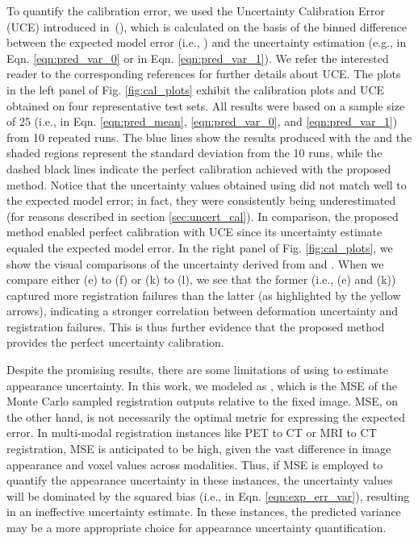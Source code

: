 \documentclass[times,twocolumn,final]{elsarticle}
\begin{document}
To quantify the calibration error, we used the Uncertainty Calibration Error (UCE) introduced in~(\cite{pmlr-v121-laves20a}), which is calculated on the basis of the binned difference between the expected model error (i.e., ) and the uncertainty estimation (e.g.,  in Eqn. \ref{eqn:pred_var_0} or  in Eqn. \ref{eqn:pred_var_1}). We refer the interested reader to the corresponding references for further details about UCE. The plots in the left panel of Fig. \ref{fig:cal_plots} exhibit the calibration plots and UCE obtained on four representative test sets. All results were based on a sample size of 25 (i.e.,  in Eqn. \ref{eqn:pred_mean}, \ref{eqn:pred_var_0}, and \ref{eqn:pred_var_1}) from 10 repeated runs. The blue lines show the results produced with the  and the shaded regions represent the standard deviation from the 10 runs, while the dashed black lines indicate the perfect calibration achieved with the proposed method. Notice that the uncertainty values obtained using  did not match well to the expected model error; in fact, they were consistently being underestimated (for reasons described in section \ref{sec:uncert_cal}). In comparison, the proposed method enabled perfect calibration with UCE  since its uncertainty estimate equaled the expected model error. In the right panel of Fig. \ref{fig:cal_plots}, we show the visual comparisons of the uncertainty derived from  and . When we compare either (e) to (f) or (k) to (l), we see that the former (i.e., (e) and (k)) captured more registration failures than the latter (as highlighted by the yellow arrows), indicating a stronger correlation between deformation uncertainty and registration failures. This is thus further evidence that the proposed method provides the perfect uncertainty calibration.

Despite the promising results, there are some limitations of using  to estimate appearance uncertainty. In this work, we modeled  as , which is the MSE of the Monte Carlo sampled registration outputs relative to the fixed image. MSE, on the other hand, is not necessarily the optimal metric for expressing the expected error. In multi-modal registration instances like PET to CT or MRI to CT registration, MSE is anticipated to be high, given the vast difference in image appearance and voxel values across modalities. Thus, if MSE is employed to quantify the appearance uncertainty in these instances, the uncertainty values will be dominated by the squared bias (i.e.,  in Eqn. \ref{eqn:exp_err_var}), resulting in an ineffective uncertainty estimate. In these instances, the predicted variance may be a more appropriate choice for appearance uncertainty quantification.
\end{document}
